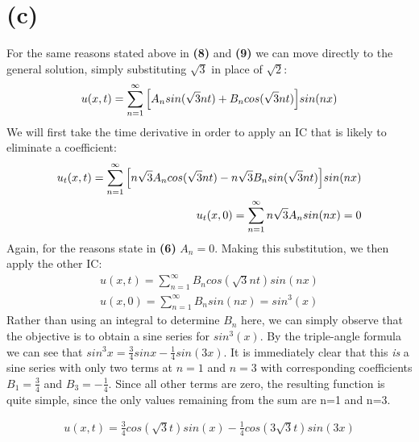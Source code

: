 \documentclass{article}
\begin{document}
\section*{\textbf{(c)}}
For the same reasons stated above in \textbf{(8)} and \textbf{(9)} we can move directly to the general solution, simply substituting $\sqrt{3}$ in place of $\sqrt{2}$:
\begin{equation}
\begin{aligned}
u(x,t) = \sum^{\infty}_{n=1}\Big{[}A_nsin(\sqrt{3}nt) + B_ncos(\sqrt{3}nt)\Big{]}sin(nx)
\end{aligned}
\end{equation}
We will first take the time derivative in order to apply an IC that is likely to eliminate a coefficient:
\begin{equation}
\begin{aligned}
u_t(x,t) = \sum^{\infty}_{n=1}\Big{[}n\sqrt{3}A_ncos(\sqrt{3}nt) - n\sqrt{3}B_nsin(\sqrt{3}nt)\Big{]}sin(nx)\\
u_t(x,0) = \sum_{n=1}^{\infty}n\sqrt{3}A_nsin(nx) = 0
\end{aligned}
\end{equation}
Again, for the reasons state in \textbf{(6)} $A_n = 0$. Making this substitution, we then apply the other IC:
\begin{equation}
\begin{aligned}
u(x,t) = \sum_{n=1}^{\infty}B_ncos(\sqrt{3}nt)sin(nx)\\
u(x,0) = \sum_{n=1}^{\infty}B_nsin(nx) = sin^3(x)
\end{aligned}
\end{equation}	
Rather than using an integral to determine $B_n$ here, we can simply observe that the objective is to obtain a sine series for $sin^3(x)$. By the triple-angle formula we can see that $sin^3x = \frac{3}{4}sinx - \frac{1}{4}sin(3x)$. It is immediately clear that this \textit{is} a sine series with only two terms at $n=1$ and $n=3$ with corresponding coefficients $B_1 = \frac{3}{4}$ and $B_3 = -\frac{1}{4}$. Since all other terms are zero, the resulting function is quite simple, since the only values remaining from the sum are n=1 and n=3. 
\begin{tcolorbox}[minipage,colback=white,arc=0pt,outer arc=0pt]
\begin{equation}
\begin{aligned}
u(x,t) = \frac{3}{4}cos(\sqrt{3}t)sin(x) - \frac{1}{4}cos(3\sqrt{3}t)sin(3x)
\end{aligned}
\end{equation}
\end{tcolorbox}
\end{document}
